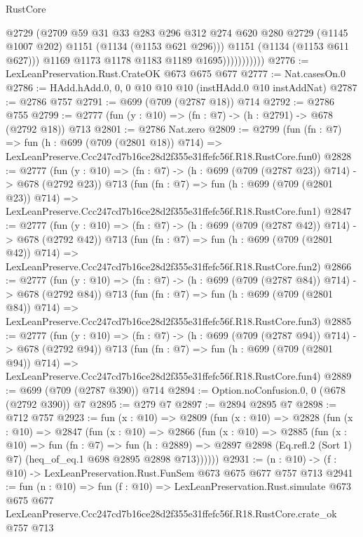 \begin{lexlean}{RustCore}
\begin{coremodule}
                            @2729
                            (@2709
                              @59
                              @31
                              @33
                              @283
                              @296
                              @312
                              @274
                              @620
                              @280
                              @2729
                              (@1145 @1007 @202)
                              @1151
                              (@1134 (@1153 @621 @296)))
                            @1151
                            (@1134 (@1153 @611 @627)))
                          @1169
                          @1173
                          @1178
                          @1183
                          @1189
                          @1695)))))))))))
@2776 := LexLeanPreservation.Rust.CrateOK @673 @675 @677
@2777 := Nat.casesOn.{0}
@2786 := HAdd.hAdd.{0, 0, 0} @10 @10 @10 (instHAdd.{0} @10 instAddNat)
@2787 := @2786 @757
@2791 := @699 (@709 (@2787 @18)) @714
@2792 := @2786 @755
@2799 := @2777 (fun (y : @10) => (fn : @7) -> (h : @2791) -> @678 (@2792 @18)) @713
@2801 := @2786 Nat.zero
@2809 := @2799
    (fun (fn : @7) =>
    fun (h : @699 (@709 (@2801 @18)) @714) =>
    LexLeanPreserve.Ccc247cd7b16ce28d2f355e31ffefc56f.R18.RustCore.fun0)
@2828 := @2777
    (fun (y : @10) => (fn : @7) -> (h : @699 (@709 (@2787 @23)) @714) -> @678 (@2792 @23))
    @713
    (fun (fn : @7) =>
    fun (h : @699 (@709 (@2801 @23)) @714) =>
    LexLeanPreserve.Ccc247cd7b16ce28d2f355e31ffefc56f.R18.RustCore.fun1)
@2847 := @2777
    (fun (y : @10) => (fn : @7) -> (h : @699 (@709 (@2787 @42)) @714) -> @678 (@2792 @42))
    @713
    (fun (fn : @7) =>
    fun (h : @699 (@709 (@2801 @42)) @714) =>
    LexLeanPreserve.Ccc247cd7b16ce28d2f355e31ffefc56f.R18.RustCore.fun2)
@2866 := @2777
    (fun (y : @10) => (fn : @7) -> (h : @699 (@709 (@2787 @84)) @714) -> @678 (@2792 @84))
    @713
    (fun (fn : @7) =>
    fun (h : @699 (@709 (@2801 @84)) @714) =>
    LexLeanPreserve.Ccc247cd7b16ce28d2f355e31ffefc56f.R18.RustCore.fun3)
@2885 := @2777
    (fun (y : @10) => (fn : @7) -> (h : @699 (@709 (@2787 @94)) @714) -> @678 (@2792 @94))
    @713
    (fun (fn : @7) =>
    fun (h : @699 (@709 (@2801 @94)) @714) =>
    LexLeanPreserve.Ccc247cd7b16ce28d2f355e31ffefc56f.R18.RustCore.fun4)
@2889 := @699 (@709 (@2787 @390)) @714
@2894 := Option.noConfusion.{0, 0} (@678 (@2792 @390)) @7
@2895 := @279 @7
@2897 := @2894 @2895 @7
@2898 := @712 @757
@2923 := fun (x : @10) =>
  @2809
    (fun (x : @10) =>
    @2828
      (fun (x : @10) =>
      @2847
        (fun (x : @10) =>
        @2866
          (fun (x : @10) =>
          @2885
            (fun (x : @10) =>
            fun (fn : @7) =>
            fun (h : @2889) =>
            @2897 @2898 (Eq.refl.{2} (Sort 1) @7) (heq_of_eq.{1} @698 @2895 @2898 @713))))))
@2931 := (n : @10) -> (f : @10) -> LexLeanPreservation.Rust.FunSem @673 @675 @677 @757 @713
@2941 := fun (n : @10) =>
  fun (f : @10) =>
  LexLeanPreservation.Rust.simulate
    @673
    @675
    @677
    LexLeanPreserve.Ccc247cd7b16ce28d2f355e31ffefc56f.R18.RustCore.crate_ok
    @757
    @713
\end{coremodule}
\end{lexlean}
